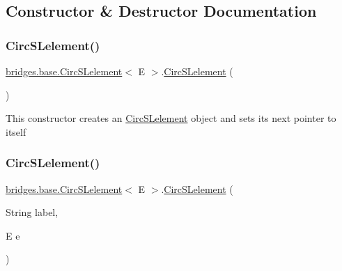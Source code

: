 \subsection{Constructor \& Destructor Documentation}
\mbox{\label{classbridges_1_1base_1_1_circ_s_lelement_a4a5a58cc7a0ec5170a828861c11df1b3}} 
\subsubsection{\texorpdfstring{CircSLelement()}{CircSLelement()}\hspace{0.1cm}{\footnotesize\ttfamily [1/4]}}
{\footnotesize\ttfamily \mbox{\hyperlink{classbridges_1_1base_1_1_circ_s_lelement}{bridges.\+base.\+Circ\+S\+Lelement}}$<$ E $>$.\mbox{\hyperlink{classbridges_1_1base_1_1_circ_s_lelement}{Circ\+S\+Lelement}} (\begin{DoxyParamCaption}{ }\end{DoxyParamCaption})}

This constructor creates an \mbox{\hyperlink{classbridges_1_1base_1_1_circ_s_lelement}{Circ\+S\+Lelement}} object and sets its next pointer to itself \mbox{\label{classbridges_1_1base_1_1_circ_s_lelement_a213d61713e51295d756669def911f080}} 
\subsubsection{\texorpdfstring{CircSLelement()}{CircSLelement()}\hspace{0.1cm}{\footnotesize\ttfamily [2/4]}}
{\footnotesize\ttfamily \mbox{\hyperlink{classbridges_1_1base_1_1_circ_s_lelement}{bridges.\+base.\+Circ\+S\+Lelement}}$<$ E $>$.\mbox{\hyperlink{classbridges_1_1base_1_1_circ_s_lelement}{Circ\+S\+Lelement}} (\begin{DoxyParamCaption}\item[{String}]{label,  }\item[{E}]{e }\end{DoxyParamCaption})}

